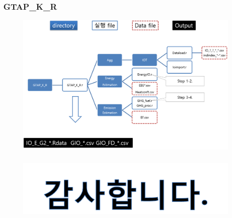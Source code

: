 \documentclass[10pt,compress,slidetop,%
			   hyperref={unicode},xcolor={svgnames},%
			   t]{beamer}
\begin{document}
\begin{frame}
	\frametitle{GTAP\_K\_R}
	  	\begin{figure}
	\centering
	 \includegraphics[width=1.00\textwidth]{GTAPKR.png}
	\end{figure}	
	
\end{frame}




%
\begin{frame}
	\frametitle{}
	  	\begin{figure}
	\centering
	 \includegraphics[width=1.00\textwidth]{thanks.png}
	\end{figure}	
	
\end{frame}
\end{document}
